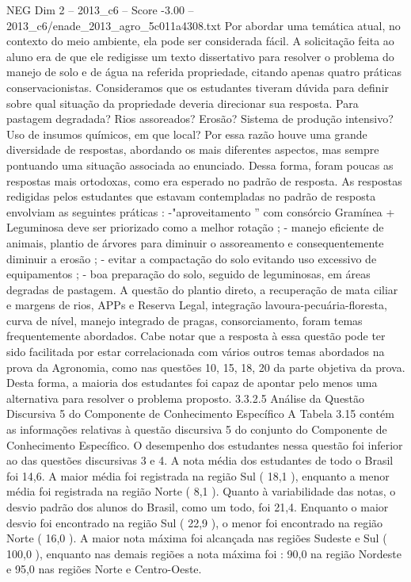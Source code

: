 \begin{textsample}{NEG Dim 2 – 2013\_c6 – Score -3.00 – 2013\_c6/enade\_2013\_agro\_5c011a4308.txt}
Por abordar uma temática atual, no contexto do meio ambiente, ela pode ser considerada fácil.
A solicitação feita ao aluno era de que ele redigisse um texto dissertativo para resolver o problema do manejo de solo e de água na referida propriedade, citando apenas quatro práticas conservacionistas.
Consideramos que os estudantes tiveram dúvida para definir sobre qual situação da propriedade deveria direcionar sua resposta.
Para pastagem degradada?
Rios assoreados?
Erosão?
Sistema de produção intensivo?
Uso de insumos químicos, em que local?
Por essa razão houve uma grande diversidade de respostas, abordando os mais diferentes aspectos, mas sempre pontuando uma situação associada ao enunciado.
Dessa forma, foram poucas as respostas mais ortodoxas, como era esperado no padrão de resposta.
As respostas redigidas pelos estudantes que estavam contempladas no padrão de resposta envolviam as seguintes práticas : -"aproveitamento ” com consórcio Gramínea + Leguminosa deve ser priorizado como a melhor rotação ; - manejo eficiente de animais, plantio de árvores para diminuir o assoreamento e consequentemente diminuir a erosão ; - evitar a compactação do solo evitando uso excessivo de equipamentos ; - boa preparação do solo, seguido de leguminosas, em áreas degradas de pastagem.
A questão do plantio direto, a recuperação de mata ciliar e margens de rios, APPs e Reserva Legal, integração lavoura-pecuária-floresta, curva de nível, manejo integrado de pragas, consorciamento, foram temas frequentemente abordados.
Cabe notar que a resposta à essa questão pode ter sido facilitada por estar correlacionada com vários outros temas abordados na prova da Agronomia, como nas questões 10, 15, 18, 20 da parte objetiva da prova.
Desta forma, a maioria dos estudantes foi capaz de apontar pelo menos uma alternativa para resolver o problema proposto. 3.3.2.5 Análise da Questão Discursiva 5 do Componente de Conhecimento Específico A Tabela 3.15 contém as informações relativas à questão discursiva 5 do conjunto do Componente de Conhecimento Específico.
O desempenho dos estudantes nessa questão foi inferior ao das questões discursivas 3 e 4.
A nota média dos estudantes de todo o Brasil foi 14,6.
A maior média foi registrada na região Sul ( 18,1 ), enquanto a menor média foi registrada na região Norte ( 8,1 ).
Quanto à variabilidade das notas, o desvio padrão dos alunos do Brasil, como um todo, foi 21,4.
Enquanto o maior desvio foi encontrado na região Sul ( 22,9 ), o menor foi encontrado na região Norte ( 16,0 ).
A maior nota máxima foi alcançada nas regiões Sudeste e Sul ( 100,0 ), enquanto nas demais regiões a nota máxima foi : 90,0 na região Nordeste e 95,0 nas regiões Norte e Centro-Oeste.

\end{textsample}

